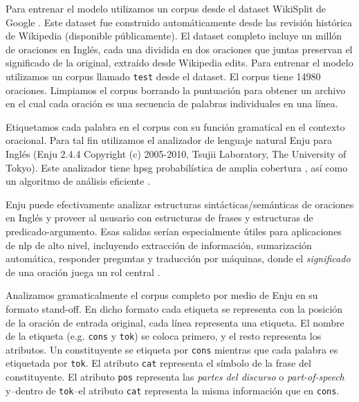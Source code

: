 {Para entrenar el modelo utilizamos un corpus desde el dataset WikiSplit de Google  \cite{BothaEtAl2018}.
Este dataset fue construido automáticamente desde las revisión histórica de Wikipedia (disponible públicamente).
El dataset completo incluye un millón de oraciones en Inglés, cada una dividida en dos oraciones que juntas preservan el significado de la original, extraído desde Wikipedia edits.
Para entrenar el modelo utilizamos un corpus llamado \texttt{test} desde el dataset.
El corpus tiene 14980 oraciones. Limpiamos el corpus borrando la puntuación para obtener un archivo en el cual cada oración es una secuencia de palabras individuales en una línea.

Etiquetamos cada palabra en el corpus con su función gramatical en el contexto oracional.
Para tal fin utilizamos el analizador de lenguaje natural Enju para Inglés (Enju 2.4.4 Copyright (c) 2005-2010, Tsujii Laboratory, The University of Tokyo).
Este analizador tiene \gls{hpsg} probabilística de amplia cobertura \cite{Yusuke:2002:MEE:1289189.1289214, noauthor_2_nodate, Miyao2004CorpusOrientedGD, Miyao:2005:PDM:1219840.1219851, Ninomiya:2006:ELM:1610075.1610100, Ninomiya:2007:LMN:1621410.1621418, Miyao:2008:FFM:1350986.1350988}, así como un algoritmo de análisis eficiente \cite{tsuruoka:2004b, Ninomiya:2005:EBT:1654494.1654505, bc22fe91f8a743269f26f92abfd79790, Matsuzaki:2007:EHP:1625275.1625546}.

Enju puede efectivamente analizar estructuras sintácticas/semánticas de oraciones en Inglés y proveer al ususario con estructuras de frases y estructuras de predicado-argumento.
Esas salidas serían especialmente útiles para aplicaciones de \gls{nlp} de alto nivel, incluyendo extracción de información, sumarización automática, responder preguntas y traducción por máquinas, donde el \emph{significado} de una oración juega un rol central \cite{noauthor_english_2019}.

Analizamos gramaticalmente el corpus completo por medio de Enju en su formato stand-off.
En dicho formato cada etiqueta se representa con la posición de la oración de entrada original, cada línea representa una etiqueta.
El nombre de la etiqueta (e.g. \texttt{cons} y \texttt{tok}) se coloca primero, y el resto representa los atributos.
Un constituyente se etiqueta por \texttt{cons} mientras que cada palabra es etiquetada por \texttt{tok}.
El atributo \texttt{cat} representa el símbolo de la frase del constituyente. El atributo \texttt{pos} representa las \emph{partes del discurso} o \emph{part-of-speech} y--dentro de \texttt{tok}--el atributo \texttt{cat} representa la misma información que en \texttt{cons}.

}
